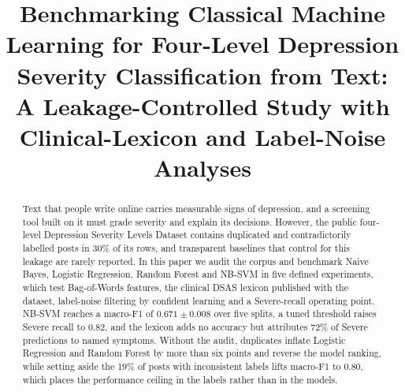 \documentclass[conference]{IEEEtran}
\begin{document}
\title{Benchmarking Classical Machine Learning for Four-Level Depression Severity Classification from Text: A Leakage-Controlled Study with Clinical-Lexicon and Label-Noise Analyses}

\author{
\and
{}
\and
{}
}

\maketitle

\begin{abstract}
Text that people write online carries measurable signs of depression, and a screening tool built on it must grade severity and explain its decisions. However, the public four-level Depression Severity Levels Dataset contains duplicated and contradictorily labelled posts in 30\% of its rows, and transparent baselines that control for this leakage are rarely reported. In this paper we audit the corpus and benchmark Naive Bayes, Logistic Regression, Random Forest and NB-SVM in five defined experiments, which test Bag-of-Words features, the clinical DSAS lexicon published with the dataset, label-noise filtering by confident learning and a Severe-recall operating point. NB-SVM reaches a macro-F1 of $0.671\pm0.008$ over five splits, a tuned threshold raises Severe recall to 0.82, and the lexicon adds no accuracy but attributes 72\% of Severe predictions to named symptoms. Without the audit, duplicates inflate Logistic Regression and Random Forest by more than six points and reverse the model ranking, while setting aside the 19\% of posts with inconsistent labels lifts macro-F1 to 0.80, which places the performance ceiling in the labels rather than in the models.
\end{abstract}
\end{document}
